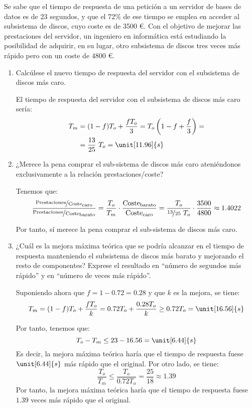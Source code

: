 \begin{ejercicio}
Se sabe que el tiempo de respuesta de una petición a un servidor de bases de datos es de 23 segundos, y que el 72\% de ese tiempo se emplea en acceder al subsistema de discos, cuyo coste es de 3500 \euro. Con el objetivo de mejorar las prestaciones del servidor, un ingeniero en informática está estudiando la posibilidad de adquirir, en su lugar, otro subsistema de discos tres veces más rápido pero con un coste de 4800 \euro.
\begin{enumerate}
    \item Calcúlese el nuevo tiempo de respuesta del servidor con el subsistema de discos más caro.
    
    El tiempo de respuesta del servidor con el subsistema de discos más caro sería:
    \begin{align*}
        T_m &= (1-f)T_o + \dfrac{fT_o}{3} = T_o\left(1-f+\dfrac{f}{3}\right)
        =\\&= \dfrac{13}{25}\ T_o = \unit[11.96]{s}
    \end{align*}
    \item ¿Merece la pena comprar el sub-sistema de discos más caro ateniéndonos exclusivamente a la relación prestaciones/coste?
    
    Tenemos que:
    \begin{equation*}
        \dfrac{\nicefrac{\text{Prestaciones}}{\text{Coste}}_{\text{caro}}}{\nicefrac{\text{Prestaciones}}{\text{Coste}}_{\text{barato}}} = \dfrac{T_o}{T_m}\cdot \dfrac{\text{Coste}_{\text{barato}}}{\text{Coste}_{\text{caro}}}
        = \dfrac{T_o}{\nicefrac{13}{25}\ T_o}\cdot \dfrac{3500}{4800} \approx 1.4022
    \end{equation*}

    Por tanto, sí merece la pena comprar el sub-sistema de discos más caro.
    \item ¿Cuál es la mejora máxima teórica que se podría alcanzar en el tiempo de respuesta manteniendo el subsistema de discos más barato y mejorando el resto de componentes? Exprese el resultado en “número de segundos más rápido” y en “número de veces más rápido”.
    
    Suponiendo ahora que $f=1-0.72=0.28$ y que $k$ es la mejora, se tiene:
    \begin{equation*}
        T_m = (1-f)T_o + \dfrac{fT_o}{k} = 0.72T_o + \dfrac{0.28T_o}{k}\geq 0.72T_o=\unit[16.56]{s}
    \end{equation*}

    Por tanto, tenemos que:
    \begin{equation*}
        T_o-T_m \leq 23-16.56 = \unit[6.44]{s}
    \end{equation*}
    Es decir, la mejora máxima teórica haría que el tiempo de respuesta fuese $\unit[6.44]{s}$ más rápido que el original. Por otro lado, se tiene:
    \begin{equation*}
        \dfrac{T_o}{T_m}\leq \dfrac{T_o}{0.72T_o} = \dfrac{25}{18} \approx 1.39
    \end{equation*}
    Por tanto, la mejora máxima teórica haría que el tiempo de respuesta fuese $1.39$ veces más rápido que el original.
\end{enumerate}
\end{ejercicio}
